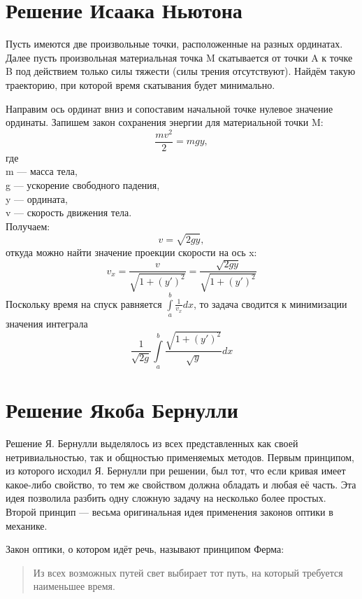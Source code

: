 \documentclass[a4paper, 12pt]{article}
\begin{document}
\newpage


\part{Решение Исаака Ньютона}

Пусть имеются две произвольные точки, расположенные на разных ординатах. Далее пусть произвольная материальная точка M скатывается от точки A к точке B под действием только силы тяжести (силы трения отсутствуют). Найдём такую траекторию, при которой время скатывания будет минимально.

Направим ось ординат вниз и сопоставим начальной точке нулевое значение ординаты. Запишем закон сохранения энергии для материальной точки M: 
\[\frac{mv^2}{2} = mgy,\]
где\\
    m — масса тела,\\
    g — ускорение свободного падения,\\
    y — ордината,\\
    v — скорость движения тела.\\
Получаем:
\[v = \sqrt{2gy},\]
откуда можно найти значение проекции скорости на ось x:
\[v_x = \frac{v}{\sqrt{1 + (y')^2}} = \frac{\sqrt{2gy}}{\sqrt{1 + (y')^2}}\] 
Поскольку время на спуск равняется $\displaystyle \int\limits_a^b \frac{1}{v_x}dx$, то задача сводится к минимизации значения интеграла
\[\frac{1}{\sqrt{2g}}\displaystyle \int\limits_a^b \frac{\sqrt{1 + (y')^2}}{\sqrt{y}}dx\]
\newpage

\part{Решение Якоба Бернулли}
Решение Я. Бернулли выделялось из всех представленных как своей нетривиальностью, так и общностью применяемых методов. Первым принципом, из которого исходил Я. Бернулли при решении, был тот, что если кривая имеет какое-либо свойство, то тем же свойством должна обладать и любая её часть. Эта идея позволила разбить одну сложную задачу на несколько более простых. Второй принцип — весьма оригинальная идея применения законов оптики в механике.

Закон оптики, о котором идёт речь, называют принципом Ферма:

\begin{quote}
\begin{large}
Из всех возможных путей свет выбирает тот путь, на который требуется наименьшее время.
\end{large}
\end{quote}
\end{document}
